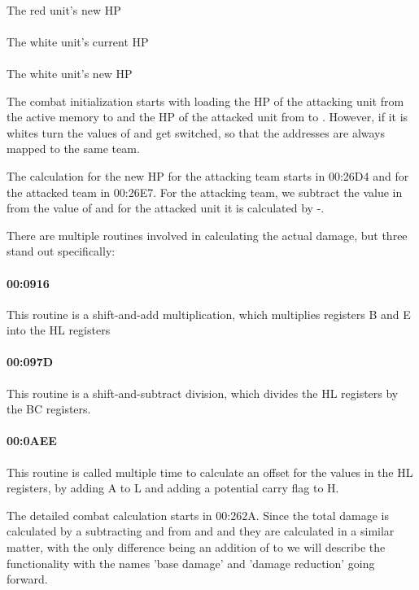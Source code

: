 \paragraph{}
The red unit's new HP
\paragraph{}
The white unit's current HP
\paragraph{}
The white unit's new HP

The combat initialization starts with loading the HP of the attacking unit from the active memory  to  and the HP of the attacked unit from  to . However, if it is whites turn the values of  and  get switched, so that the addresses are always mapped to the same team.

The calculation for the new HP for the attacking team starts in 00:26D4 and for the attacked team in 00:26E7.
For the attacking team, we subtract the value in  from the value of  and for the attacked unit it is calculated by -.

There are multiple routines involved in calculating the actual damage, but three stand out specifically:
\setcounter{paragraph}{0}
\paragraph{00:0916} This routine is a shift-and-add multiplication, which multiplies registers B and E into the HL registers
\paragraph{00:097D} This routine is a shift-and-subtract division, which divides the HL registers by the BC registers.
\paragraph{00:0AEE} This routine is called multiple time to calculate an offset for the values in the HL registers, by adding A to L and adding a potential carry  flag to H.

The detailed combat calculation starts in 00:262A.
Since the total damage is calculated by a subtracting  and  from  and  and they are calculated in a similar matter, with the only difference being an addition of  to  we will describe the functionality with the names 'base damage' and 'damage reduction' going forward.

